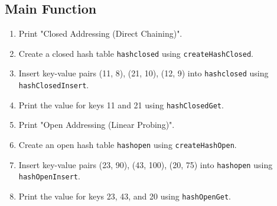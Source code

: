 {  \subsection{Main Function}
  \begin{enumerate}[label=\arabic*.,left=0pt]
    \item Print "Closed Addressing (Direct Chaining)".
    \item Create a closed hash table \texttt{hashclosed} using \texttt{createHashClosed}.
    \item Insert key-value pairs (11, 8), (21, 10), (12, 9) into \texttt{hashclosed} using \texttt{hashClosedInsert}.
    \item Print the value for keys 11 and 21 using \texttt{hashClosedGet}.
    \item Print "Open Addressing (Linear Probing)".
    \item Create an open hash table \texttt{hashopen} using \texttt{createHashOpen}.
    \item Insert key-value pairs (23, 90), (43, 100), (20, 75) into \texttt{hashopen} using \texttt{hashOpenInsert}.
    \item Print the value for keys 23, 43, and 20 using \texttt{hashOpenGet}.
  \end{enumerate}
 }


